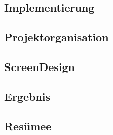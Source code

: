 \begin{spacing}{1}
\chapter{Implementierung}
\end{spacing}


\begin{spacing}{1}
\chapter{Projektorganisation}
\end{spacing}


\begin{spacing}{1}
\chapter{ScreenDesign}\label{chapter:implementation}
\end{spacing}


\begin{spacing}{1}
\chapter{Ergebnis}
\label{chapter:ergebnis}
\end{spacing}

	
\begin{spacing}{1}
\chapter{Resümee}
\label{chapter:resumme}
\end{spacing}


\appendix
{}


\newpage
{}


\printglossary[title=Glossar,toctitle=Glossar] %
\listoffigures
\listoftables
\lstlistoflistings
	
